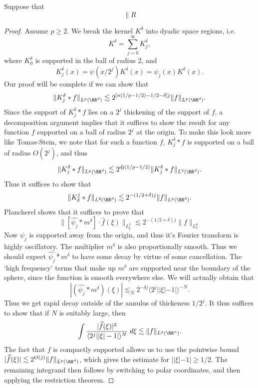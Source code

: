 \begin{theorem}
    Suppose that
    \[ \| R \]
\end{theorem}
\begin{proof}
    Assume $p \geq 2$. We break the kernel $K^\delta$ into dyadic space regions, i.e.
    \[ K^\delta = \sum_{j = 0}^\infty K^\delta_j, \]
    where $K^\delta_0$ is supported in the ball of radius 2, and
    \[ K^\delta_j(x) = \psi(x/2^j) K^\delta(x) = \psi_j(x) K^\delta(x). \]
    Our proof will be complete if we can show that
    \[ \| K^\delta_j * f \|_{L^p(\RR^d)} \lesssim 2^{[n(1/p - 1/2) - 1/2 - \delta] j} \| f \|_{L^p(\RR^d)}. \]
    Since the support of $K^\delta_j * f$ lies on a $2^j$ thickening of the support of $f$, a decomposition argument implies that it suffices to show the result for any function $f$ supported on a ball of radius $2^j$ at the origin. To make this look more like Tomas-Stein, we note that for such a function $f$, $K^\delta_j * f$ is supported on a ball of radius $O(2^j)$, and thus
    \[ \| K^\delta_j * f \|_{L^p(\RR^d)} \lesssim 2^{dj(1/p - 1/2)} \| K^\delta_j * f \|_{L^2(\RR^d)}. \]
    Thus it suffices to show that
    \[ \| K_\delta^j * f \|_{L^2(\RR^d)} \lesssim 2^{-(1/2 + \delta)j} \| f \|_{L^p(\RR^d)}. \]
    Plancherel shows that it suffices to prove that
    \[ \| [ \widehat{\psi_j} * m^\delta] \cdot \widehat{f}(\xi) \|_{L^2_\xi} \lesssim 2^{-(1/2 + \delta) j} \| f \|_{L^p_x} \]
    Now $\psi_j$ is supported away from the origin, and thus it's Fourier transform is highly oscillatory. The multiplier $m^\delta$ is also proportionally smooth. Thus we should expect $\widehat{\psi_j} * m^\delta$ to have some decay by virtue of some cancellation. The `high frequency' terms that make up $m^\delta$ are supported near the boundary of the sphere, since the function is smooth everywhere else. We will actually obtain that
    \[ |(\widehat{\psi_j} * m^\delta)(\xi)| \lesssim_N 2^{-\delta j} \langle 2^j ||\xi| - 1| \rangle^{-N}. \]
    Thus we get rapid decay outside of the annulus of thickeness $1/2^j$. It thus suffices to show that if $N$ is suitably large, then
    \[ \int \frac{|\widehat{f}(\xi)|^2}{\langle 2^j ||\xi| - 1| \rangle^N}\; d\xi \lesssim \| f \|_{L^p(\RR^n)}. \]
    The fact that $f$ is compactly supported allows us to use the pointwise bound $|\widehat{f}(\xi)| \lesssim 2^{O(j)} \| f \|_{L^p(\RR^d)}$, which gives the estimate for $||\xi| - 1| \geq 1/2$. The remaining integrand then follows by switching to polar coordinates, and then applying the restriction theorem.


\end{proof}
